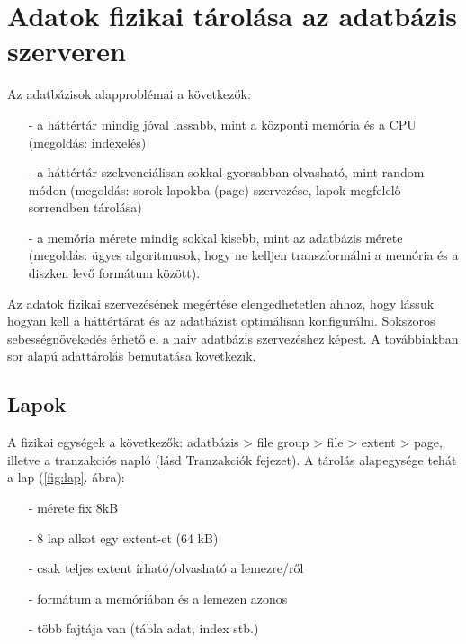 \documentclass[12pt]{article}
\theoremstyle{plain}
\begin{document}
\section{Adatok fizikai tárolása az adatbázis szerveren}

Az adatbázisok alapproblémai a következők:
\begin{itemize}
    \item[-] a háttértár mindig jóval lassabb, mint a központi memória és a CPU (megoldás: indexelés)
    \item[-] a háttértár szekvenciálisan sokkal gyorsabban olvasható, mint random módon
    (megoldás: sorok lapokba (page) szervezése,  lapok megfelelő sorrendben tárolása)
    \item[-] a memória mérete mindig sokkal kisebb, mint az adatbázis mérete (megoldás: ügyes algoritmusok, hogy ne kelljen transzformálni a memória és a diszken levő formátum között). 
\end{itemize}{}
Az adatok fizikai szervezésének megértése elengedhetetlen ahhoz, hogy lássuk hogyan kell a háttértárat és az adatbázist optimálisan konfigurálni. Sokszoros sebességnövekedés érhető el a naiv adatbázis szervezéshez képest. A  továbbiakban sor alapú adattárolás bemutatása következik. 
\\
\subsection{Lapok}
A fizikai egységek a következők: adatbázis > file group > file > extent > page, illetve a tranzakciós napló (lásd Tranzakciók fejezet). A tárolás alapegysége tehát a lap (\ref{fig:lap}. ábra):
\begin{itemize}
    \item[-] mérete fix 8kB
    \item[-] 8 lap alkot egy extent-et (64 kB)
    \item[-] csak teljes extent írható/olvasható a lemezre/ről
    \item[-] formátum a memóriában és a lemezen azonos
    \item[-] több fajtája van (tábla adat, index stb.)
\end{itemize}{}
\end{document}
